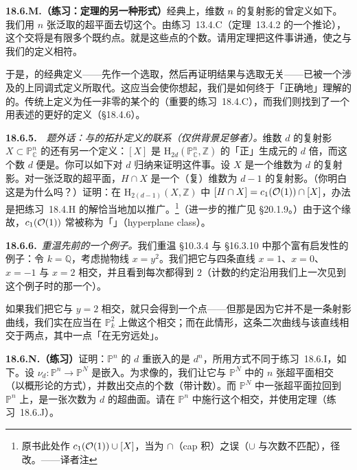 \textbf{18.6.M.（练习：\trBezout{}定理的另一种形式）}\quad 经典上，维数 $n$ 的复射影\trVariety{}的\trDegree{}曾定义如下。我们用 $n$ 张泛取的超平面去切这个\trVariety。由\mbox{练习~13.4.C}（\trBertini{}定理~\mbox{13.4.2} 的一个推论），这个交将是有限多个既约点。\trDegree{}就是这些点的个数。请用\trBezout{}定理把这件事讲通，使之与我们\trDegree{}的定义相符。

于是，\trDegree{}的经典定义——先作一个选取，然后再证明结果与选取无关——已被一个涉及\trEulerCharacteristic{}的上同调式定义所取代。这应当会使你想起，我们是如何终于「正确地」理解\trLineBundle{}的\trDegree{}的。\trDegree{}传统上定义为任一非零\trRational\trSection{}的某个\trDivisor{}的\trDegree{}（重要的\mbox{练习~18.4.C}），而我们则找到了一个用\trEulerCharacteristic{}表述的更好的定义（\S18.4.6）。

\textbf{18.6.5.}\ \extrahard\ \emph{题外话：与\trDegree{}的拓扑定义的联系（仅供背景足够者）。}\quad 维数 $d$ 的复射影\trVariety{} $X\subset\mathbb{P}^n_\mathbb{C}$ 的\trDegree{}还有另一个定义：$[X]$ 是 $\mathrm{H}_{2d}(\mathbb{P}^n_\mathbb{C},\mathbb{Z})$ 的「正」生成元的 $d$ 倍，而这个数 $d$ 便是\trDegree。你可以如下对 $d$ 归纳来证明这件事。设 $X$ 是一个维数为 $d$ 的复射影\trVariety。对一张泛取的超平面，$H\cap X$ 是一个（复）维数为 $d-1$ 的复射影\trVariety。（你明白这是为什么吗？）证明：在 $\mathrm{H}_{2(d-1)}(X,\mathbb{Z})$ 中 $[H\cap X]=c_1(\mathcal{O}(1))\cap[X]$，办法是把\mbox{练习~18.4.H} 的解恰当地加以推广。\footnote{原书此处作 $c_1(\mathcal{O}(1))\cup[X]$，当为 $\cap$（cap 积）之误（$\cup$ 与次数不匹配），径改。——译者注}（进一步的推广见 \S20.1.9。）由于这个缘故，$c_1(\mathcal{O}(1))$ 常被称为「\trHyperplaneClass」（hyperplane class）。

\textbf{18.6.6.}\ \emph{重温先前的一个例子。}\quad 我们重温 \S10.3.4 与 \S16.3.10 中那个富有启发性的例子：令 $k=\mathbb{Q}$，考虑抛物线 $x=y^2$。我们把它与四条直线 $x=1$、$x=0$、$x=-1$ 与 $x=2$ 相交，并且看到每次都得到 $2$（计数的约定沿用我们上一次见到这个例子时的那一个）。

如果我们把它与 $y=2$ 相交，就只会得到一个点——但那是因为它并不是一条射影曲线，我们实在应当在 $\mathbb{P}^2_k$ 上做这个相交；而在此情形，这条二次曲线与该直线相交于两点，其中一点「在无穷远处」。

\textbf{18.6.N.（练习）}\quad 证明：$\mathbb{P}^n$ 的 $d$ 重\trVeronese{}嵌入的\trDegree{}是 $d^n$，所用方式不同于\mbox{练习~18.6.I}，如下。设 $\nu_d\colon\mathbb{P}^n\to\mathbb{P}^N$ 是\trVeronese{}嵌入。为求像的\trDegree，我们让它与 $\mathbb{P}^N$ 中的 $n$ 张超平面相交（以概形论的方式），并数出交点的个数（带\trMultiplicity{}计数）。而 $\mathbb{P}^N$ 中一张超平面拉回到 $\mathbb{P}^n$ 上，是一张次数为 $d$ 的超曲面。请在 $\mathbb{P}^n$ 中施行这个相交，并使用\trBezout{}定理（\mbox{练习~18.6.J}）。

